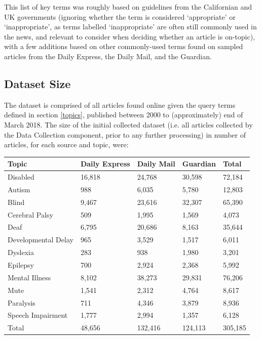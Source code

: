 \documentclass{report}
\begin{document}
This list of key terms was roughly based on guidelines from the Californian \cite{ca-guideline} and UK \cite{uk-guideline} governments (ignoring whether the term is considered `appropriate' or `inappropriate', as terms labelled `inappropriate' are often still commonly used in the news, and relevant to consider when deciding whether an article is on-topic), with a few additions based on other commonly-used terms found on sampled articles from the Daily Express, the Daily Mail, and the Guardian.

\subsection{Dataset Size} \label{dataset-size}

The dataset is comprised of all articles found online given the query terms defined in section \ref{topics}, published between 2000 to (approximately) end of March 2018.
The size of the initial collected dataset (i.e. all articles collected by the Data Collection component, prior to any further processing) in number of articles, for each source and topic, were:

\begin{center}
	\begin{tabu} to 1.0\textwidth { | X[c] | X[c] | X[c] | X[c] | X[c] | }
		\hline
		Topic & Daily Express & Daily Mail & Guardian & Total \\
		\hline
		Disabled & 16,818 & 24,768 & 30,598 & 72,184  \\
		\hline
		Autism & 988 & 6,035 & 5,780 & 12,803  \\
		\hline
		Blind & 9,467 & 23,616 & 32,307 & 65,390  \\
		\hline
		Cerebral Palsy & 509 & 1,995 & 1,569 & 4,073  \\
		\hline
		Deaf & 6,795 & 20,686 & 8,163 & 35,644  \\
		\hline
		Developmental Delay & 965 & 3,529 & 1,517 & 6,011  \\
		\hline
		Dyslexia & 283 & 938 & 1,980 & 3,201  \\
		\hline
		Epilepsy & 700 & 2,924 & 2,368 & 5,992  \\
		\hline
		Mental Illness & 8,102 & 38,273 & 29,831 & 76,206  \\
		\hline
		Mute & 1,541 & 2,312 & 4,764 & 8,617  \\
		\hline
		Paralysis & 711 & 4,346 & 3,879 & 8,936  \\
		\hline
		Speech Impairment & 1,777 & 2,994 & 1,357 & 6,128  \\
		\hline
		Total & 48,656 & 132,416 & 124,113 & 305,185  \\
		\hline
	\end{tabu}
\end{center}
\end{document}
